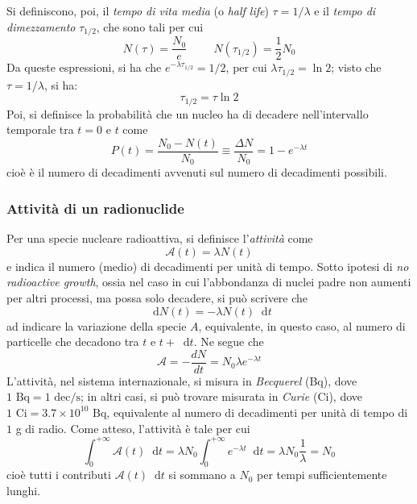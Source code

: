 \documentclass[11pt, a4paper]{scrartcl}
\theoremstyle{style}
\newcommand{\dd}{\mathop{}\!\mathrm{d}}
\numberwithin{equation}{subsection}
\begin{document}
Si definiscono, poi, il \textit{tempo di vita media} (o \textit{half life}) $\tau  = 1 / \lambda $ e il \textit{tempo di dimezzamento} $\tau _{1 / 2}$, che sono tali per cui 
\[
N(\tau ) = \frac{N_0}{e}\hspace{1cm}N(\tau _{1 / 2}) = \frac{1}{2} N_0 
\] 
Da queste espressioni, si ha che $e^{-\lambda \tau _{1 / 2}} = 1 / 2$, per cui $\lambda \tau _{ 1 / 2} = \ln 2$; visto che $\tau  = 1 / \lambda $, si ha:
\begin{equation}
	\tau _{ 1 / 2 } = \tau  \ln 2
\end{equation}
Poi, si definisce la probabilit\`a che un nucleo ha di decadere nell'intervallo temporale tra $t=0$ e $t$ come
\begin{equation}
	P(t) = \frac{N_0 - N(t)}{N_0} \equiv \frac{\Delta N}{N_0} = 1 - e^{-\lambda t}
\end{equation}
cio\`e \`e il numero di decadimenti avvenuti sul numero di decadimenti possibili.
\subsubsection{Attivit\`a di un radionuclide}

Per una specie nucleare radioattiva, si definisce l'\textit{attivit\`a}  come
\begin{equation}
	\mathcal{A} (t) = \lambda N(t)
\end{equation}
e indica il numero (medio) di decadimenti per unit\`a di tempo.
Sotto ipotesi di \textit{no radioactive growth}, ossia nel caso in cui l'abbondanza di nuclei padre non aumenti per altri processi, ma possa solo decadere, si pu\`o scrivere che 
\[
\dd N(t) = - \lambda  N(t) \dd t
\] 
ad indicare la variazione della specie $A$, equivalente, in questo caso, al numero di particelle che decadono tra $t$ e $t+\dd t$.
Ne segue che 
\begin{equation}
	\mathcal{A}  = -\frac{d N}{d t}  = N_0 \lambda  e^{-\lambda t}
\end{equation}
L'attivit\`a, nel sistema internazionale, si misura in \textit{Becquerel} (Bq), dove $1 \text{ Bq}= 1 \text{ dec}/\text{s}$; in altri casi, si pu\`o trovare misurata in \textit{Curie} (Ci), dove $1\text{ Ci} = 3.7 \times 10^{10} \text{ Bq}$, equivalente al numero di decadimenti per unit\`a di tempo di $1$ g di radio.
Come atteso, l'attivit\`a \`e tale per cui
\[
\int _0^{+\infty} \mathcal{A} (t) \dd t = \lambda N_0  \int _0^{+\infty}e^{-\lambda t}\dd t = \lambda N_0 \frac{1}{\lambda } = N_0
\] 
cio\`e tutti i contributi $\mathcal{A} (t) \dd t$ si sommano a $N_0$ per tempi sufficientemente lunghi.
\end{document}
